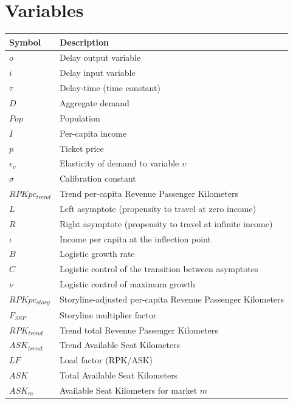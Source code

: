 \documentclass[
]{kaohandt}
\begin{document}
\newpage

\section*{Variables}

\begin{center}
\footnotesize
\begin{tabular}{l l}
\toprule
Symbol & Description \\
\midrule
$o$ & Delay output variable \\
$i$ & Delay input variable \\
$\tau$ & Delay-time (time constant) \\
$D$ & Aggregate demand \\
$Pop$ & Population \\
$I$ & Per-capita income \\
$p$ & Ticket price \\
$\epsilon_{\upsilon}$ & Elasticity of demand to variable $\upsilon$ \\
$\sigma$ & Calibration constant \\
$RPKpc_{trend}$ & Trend per-capita Revenue Passenger Kilometers \\
$L$ & Left asymptote (propensity to travel at zero income) \\
$R$ & Right asymptote (propensity to travel at infinite income) \\
$\iota$ & Income per capita at the inflection point \\
$B$ & Logistic growth rate \\
$C$ & Logistic control of the transition between asymptotes \\
$\nu$ & Logistic control of maximum growth \\
$RPKpc_{story}$ & Storyline-adjusted per-capita Revenue Passenger Kilometers \\
$F_{SSP}$ & Storyline multiplier factor \\
$RPK_{trend}$ & Trend total Revenue Passenger Kilometers \\
$ASK_{trend}$ & Trend Available Seat Kilometers \\
$LF$ & Load factor (RPK/ASK) \\
$ASK$ & Total Available Seat Kilometers \\
$ASK_m$ & Available Seat Kilometers for market $m$ \\

\end{tabular}
\end{center}
\end{document}
